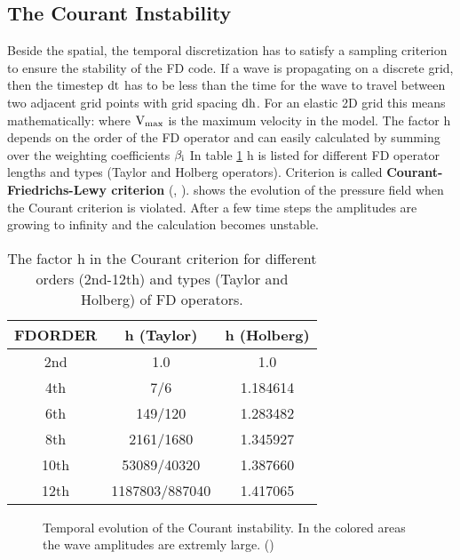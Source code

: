 \subsection{The Courant Instability}\label{courandt}
Beside the spatial, the temporal discretization has to satisfy a sampling criterion to ensure the stability of the FD code. If a 
wave is propagating on a discrete grid, then the timestep $\rm{dt}$ has to be less than the time for the wave to travel between two adjacent grid 
points with grid spacing $\rm{dh}$. For an elastic 2D grid this means mathematically:
where $\rm{V_{max}}$ is the maximum velocity in the model. The factor h depends on the order of the FD operator and can easily calculated by summing over the weighting coefficients $\rm{\beta_i}$
In table \ref{courant.1} h is listed for different FD operator lengths and types (Taylor and Holberg operators). Criterion  
is called {\bf{Courant-Friedrichs-Lewy criterion}} (\cite{courant:28}, \cite{courant:67}).  shows the evolution of the pressure field when the Courant criterion is violated. After a few time steps the amplitudes are growing to infinity and the calculation becomes unstable.
\begin{table}[hbt]
\begin{center}
\begin{tabular}{ccc}\hline \hline
FDORDER & h (Taylor)      & h (Holberg) \\ \hline 
2nd   &   1.0             &  1.0        \\
4th   &   7/6             &  1.184614   \\
6th   &   149/120         &  1.283482   \\
8th   &   2161/1680       &  1.345927   \\
10th  &   53089/40320     &  1.387660   \\
12th  &   1187803/887040  &  1.417065   \\   
\hline \hline
\end{tabular}
\caption{\label{courant.1} The factor h in the Courant criterion for different orders (2nd-12th) and types (Taylor and Holberg) of FD operators.}
\end{center}
\end{table} 
\clearpage
\begin{figure}[ht]
\begin{center}
\caption{\label{courandt_pics} Temporal evolution of the Courant instability. In the colored areas the wave amplitudes are extremly large. (\cite{koehn:11})}
\end{center}
\end{figure}
\clearpage
